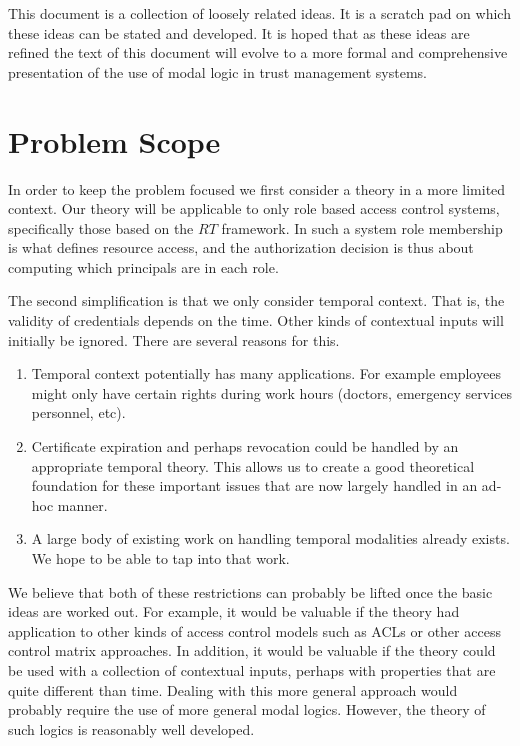 \documentclass{article}
\begin{document}
This document is a collection of loosely related ideas. It is a scratch pad on which these ideas
can be stated and developed. It is hoped that as these ideas are refined the text of this
document will evolve to a more formal and comprehensive presentation of the use of modal logic
in trust management systems.

\section{Problem Scope}

In order to keep the problem focused we first consider a theory in a more limited context. Our
theory will be applicable to only role based access control systems, specifically those based on
the $RT$ framework. In such a system role membership is what defines resource access, and the
authorization decision is thus about computing which principals are in each role.

The second simplification is that we only consider temporal context. That is, the validity of
credentials depends on the time. Other kinds of contextual inputs will initially be ignored.
There are several reasons for this.

\begin{enumerate}
\item Temporal context potentially has many applications. For example employees might only have
  certain rights during work hours (doctors, emergency services personnel, etc).
\item Certificate expiration and perhaps revocation could be handled by an appropriate temporal
  theory. This allows us to create a good theoretical foundation for these important issues that
  are now largely handled in an ad-hoc manner.
\item A large body of existing work on handling temporal modalities already exists. We hope to
  be able to tap into that work.
\end{enumerate}

We believe that both of these restrictions can probably be lifted once the basic ideas are
worked out. For example, it would be valuable if the theory had application to other kinds of
access control models such as ACLs or other access control matrix approaches. In addition, it
would be valuable if the theory could be used with a collection of contextual inputs, perhaps
with properties that are quite different than time. Dealing with this more general approach
would probably require the use of more general modal logics. However, the theory of such logics
is reasonably well developed.
\end{document}
